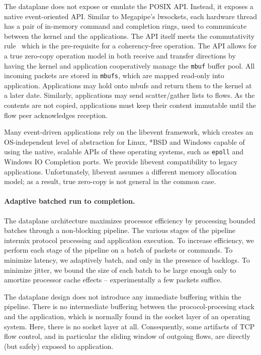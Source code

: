 The dataplane does not expose or emulate the POSIX API.  Instead, it
exposes a native event-oriented API.  Similar to Megapipe's lwsockets,
each hardware thread has a pair of in-memory command and completion
rings, used to communicate between the kernel and the applications.
The API itself meets the commutativity
rule~\cite{DBLP:conf/sosp/ClementsKZMK13} which is the pre-requisite
for a coherency-free operation.  The API allows for a true zero-copy
operation model in both receive and transfer directions by having the
kernel and application cooperatively manage the \texttt{mbuf} buffer
pool.  All incoming packets are stored in \texttt{mbufs}, which are
mapped read-only into application.  Applications may hold onto mbufs
and return them to the kernel at a later date.  Similarly,
applications may send scatter/gather lists to flows. As the contents
are not copied, applications must keep their content immutable until
the flow peer acknowledges reception.

Many event-driven applications rely on the libevent framework, which
creates an OS-independent level of abstraction for Linux, *BSD and
Windows capable of using the native, scalable APIs of these operating
systems, such as \texttt{epoll} and Windows IO Completion ports.  We
provide libevent compatibility to legacy applications. Unfortunately,
libevent assumes a different memory allocation model; as a result,
true zero-copy is not general in the common case.


\paragraph{Adaptive batched run to completion.}

The dataplane architecture maximizes processor efficiency by
processing bounded batches through a non-blocking pipeline.  The
various stages of the pipeline intermix protocol processing and
application execution.  To increase efficiency, we perform each stage
of the pipeline on a batch of packets or commands.  To minimize
latency, we adaptively batch, and only in the presence of backlogs.
To minimize jitter, we bound the size of each batch to be large enough
only to amortize processor cache effects -- experimentally a few
packets suffice.

The dataplane design does not introduce any immediate buffering within
the pipeline.  There is no intermediate buffering between the
prococol-procesing stack and the application, which is normally found
in the socket layer of an operating system. Here, there is no socket
layer at all.  Consequently, some artifacts of TCP flow control, and
in particular the sliding window of outgoing flows, are directly (but
safely) exposed to application.

